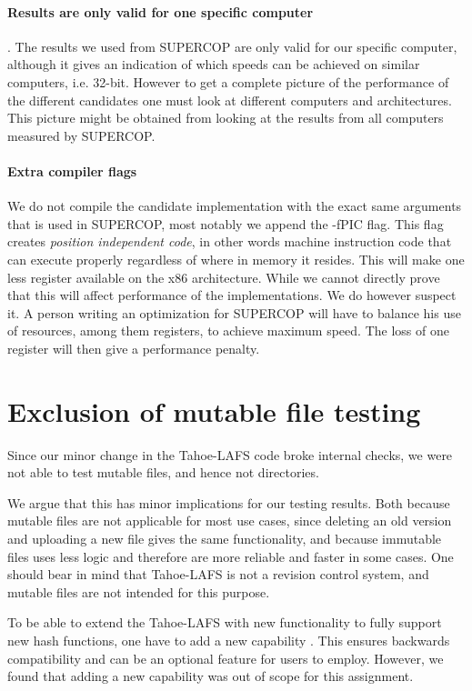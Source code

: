 \documentclass[english,12pt,a4paper]{book}
\begin{document}
\paragraph{Results are only valid for one specific computer}. The results we
used from \ac{SUPERCOP} are only valid for our specific computer, although it
gives an indication of which speeds can be achieved on similar computers, i.e.
32-bit. However to get a complete picture of the performance of the different
candidates one must look at different computers and architectures. This picture
might be obtained from looking at the results from all computers measured by
\ac{SUPERCOP}.

\paragraph{Extra compiler flags}

We do not compile the candidate implementation with the exact same arguments
that is used in \ac{SUPERCOP}, most notably we append the -fPIC flag. This flag
creates \emph{position independent code}, in other words machine instruction
code that can execute properly regardless of where in memory it resides. This
will make one less register available on the x86 architecture. While we cannot
directly prove that this will affect performance of the implementations. We do
however suspect it. A person writing an optimization for \ac{SUPERCOP} will have
to balance his use of resources, among them registers, to achieve maximum speed.
The loss of one register will then give a performance penalty.

\section{Exclusion of mutable file testing}

Since our minor change in the Tahoe-\ac{LAFS} code broke internal checks, we
were not able to test mutable files, and hence not directories.

We argue that this has minor implications for our testing results. Both because
mutable files are not applicable for most use cases, since deleting an old
version and uploading a new file gives the same functionality, and because
immutable files uses less logic and therefore are more reliable and faster in
some cases. One should bear in mind that Tahoe-\ac{LAFS} is not a revision
control system, and mutable files are not intended for this purpose.

To be able to extend the Tahoe-LAFS with new functionality to fully support new
hash functions, one have to add a new capability \cite{t_zooko}. This ensures
backwards compatibility and can be an optional feature for users to employ.
However, we found that adding a new capability was out of scope for this
assignment.
\end{document}
